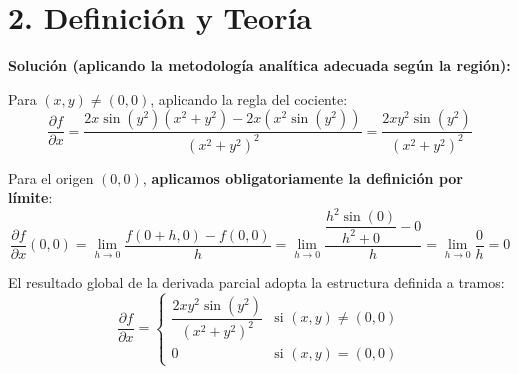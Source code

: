 \documentclass[11pt]{article}
\newenvironment{teoria}{%
  \section*{2. Definición y Teoría}%
}{}
\newenvironment{ejemplo}[1]{%
  \begin{tcolorbox}[colback=white,colframe=gray!40,title=Ejemplo: #1]%
}{%
  \end{tcolorbox}%
}
\begin{document}
\begin{teoria}
\begin{ejemplo}{Derivadas Parciales de una Función Definida a Tramos}
    \textbf{Solución (aplicando la metodología analítica adecuada según la región):}
    
    Para $(x,y) \neq (0,0)$, aplicando la regla del cociente:
    $$ \displaystyle \dfrac{\partial f}{\partial x} = \displaystyle \dfrac{2x\sin(y^2)(x^2 + y^2) - 2x(x^2\sin(y^2))}{(x^2 + y^2)^2} = \displaystyle \dfrac{2xy^2\sin(y^2)}{(x^2 + y^2)^2} $$
    
    Para el origen $(0,0)$, \textbf{aplicamos obligatoriamente la definición por límite}:
    $$ \displaystyle \dfrac{\partial f}{\partial x}(0,0) = \displaystyle \lim\limits_{h \to 0} \displaystyle \dfrac{f(0+h, 0) - f(0,0)}{h} = \displaystyle \lim\limits_{h \to 0} \displaystyle \dfrac{\displaystyle \dfrac{h^2\sin(0)}{h^2 + 0} - 0}{h} = \displaystyle \lim\limits_{h \to 0} \displaystyle \dfrac{0}{h} = 0 $$
    
    El resultado global de la derivada parcial adopta la estructura definida a tramos:
    $$ \displaystyle \dfrac{\partial f}{\partial x} = \begin{cases} \displaystyle \dfrac{2xy^2\sin(y^2)}{(x^2 + y^2)^2} & \text{si } (x,y) \neq (0,0) \\[1em] 0 & \text{si } (x,y) = (0,0) \end{cases} $$
  \end{ejemplo}

\end{teoria}
\end{document}
